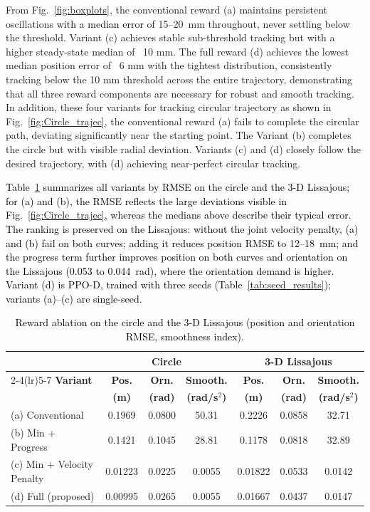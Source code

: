 \documentclass[preprint,12pt]{elsarticle}
\begin{document}
From Fig.~\ref{fig:boxplots}, the conventional reward (a) maintains persistent oscillations \textcolor{black}{with a median error} of 15–20~mm throughout, never settling below the threshold. Variant (c) achieves stable sub-threshold tracking but with a higher steady-state median of ~10 mm. The full reward (d) achieves the lowest median position error of ~6 mm with the tightest distribution, consistently tracking below the 10 mm threshold across the entire trajectory, demonstrating that all three reward components are necessary for robust and smooth tracking. In addition, these four variants for tracking circular trajectory as shown in Fig.~\ref{fig:Circle_trajec}, the conventional reward (a) fails to complete the circular path, deviating significantly near the starting point. The Variant (b) completes the circle but with visible radial deviation. Variants (c) and (d) closely follow the desired trajectory, with (d) achieving near-perfect circular tracking.

\textcolor{black}{Table~\ref{tab:ablation} summarizes all variants by RMSE on the circle and the 3-D Lissajous; for (a) and (b), the RMSE reflects the large deviations visible in Fig.~\ref{fig:Circle_trajec}, whereas the medians above describe their typical error. The ranking is preserved on the Lissajous: without the joint velocity penalty, (a) and (b) fail on both curves; adding it reduces position RMSE to 12--18~mm; and the progress term further improves position on both curves and orientation on the Lissajous (0.053 to 0.044~rad), where the orientation demand is higher. Variant (d) is PPO-D, trained with three seeds (Table~\ref{tab:seed_results}); variants (a)--(c) are single-seed.}

\begin{table}[!htbp]
\centering
\caption{\textcolor{black}{Reward ablation on the circle and the 3-D Lissajous (position and orientation RMSE, smoothness index).}}
\label{tab:ablation}
\footnotesize
\color{black}
\renewcommand{\arraystretch}{1.0}
\setlength{\tabcolsep}{4pt}
\begin{tabular}{lcccccc}
\toprule
 & \multicolumn{3}{c}{\textbf{Circle}} & \multicolumn{3}{c}{\textbf{3-D Lissajous}} \\
\cmidrule(lr){2-4}\cmidrule(lr){5-7}
\textbf{Variant} & \textbf{Pos.} & \textbf{Orn.} & \textbf{Smooth.} & \textbf{Pos.} & \textbf{Orn.} & \textbf{Smooth.} \\
 & \textbf{(m)} & \textbf{(rad)} & \textbf{(rad/s$^{2}$)} & \textbf{(m)} & \textbf{(rad)} & \textbf{(rad/s$^{2}$)} \\
\midrule
(a) Conventional             & 0.1969  & 0.0800 & 50.31  & 0.2226  & 0.0858 & 32.71 \\
(b) Min + Progress           & 0.1421  & 0.1045 & 28.81  & 0.1178  & 0.0818 & 32.89 \\
(c) Min + Velocity Penalty   & 0.01223 & 0.0225 & 0.0055 & 0.01822 & 0.0533 & 0.0142 \\
(d) Full (proposed)          & 0.00995 & 0.0265 & 0.0055 & 0.01667 & 0.0437 & 0.0147 \\
\bottomrule
\end{tabular}
\end{table}
\end{document}
